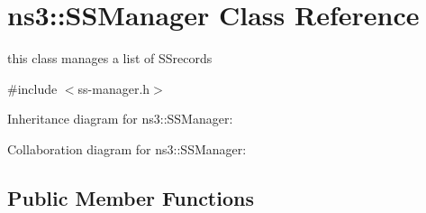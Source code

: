 \hypertarget{classns3_1_1SSManager}{}\section{ns3\+:\+:S\+S\+Manager Class Reference}
\label{classns3_1_1SSManager}


this class manages a list of S\+Srecords  




{\ttfamily \#include $<$ss-\/manager.\+h$>$}



Inheritance diagram for ns3\+:\+:S\+S\+Manager\+:


Collaboration diagram for ns3\+:\+:S\+S\+Manager\+:
\subsection*{Public Member Functions}

